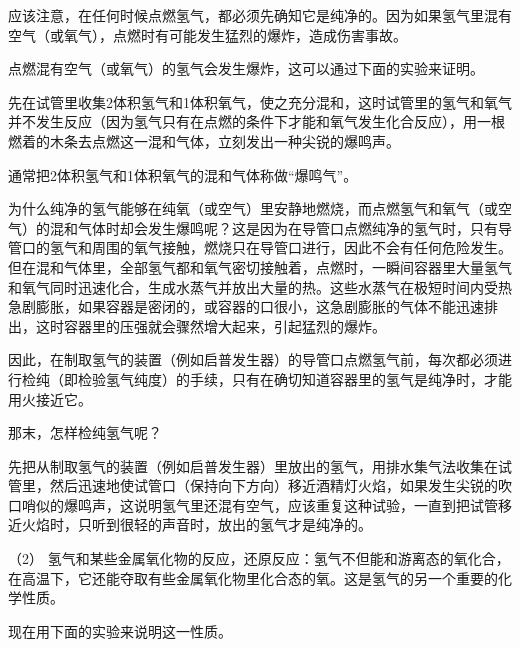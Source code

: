 应该注意，在任何时候点燃氢气，都必须先确知它是纯净的。因为如果氢气里混有空气（或氧气），点燃时有可能发生猛烈的爆炸，造成伤害事故。

点燃混有空气（或氧气）的氢气会发生爆炸，这可以通过下面的实验来证明。

先在试管里收集2体积氢气和1体积氧气，使之充分混和，这时试管里的氢气和氧气并不发生反应（因为氢气只有在点燃的条件下才能和氧气发生化合反应），用一根燃着的木条去点燃这一混和气体，立刻发出一种尖锐的爆鸣声。

通常把2体积氢气和1体积氧气的混和气体称做``爆鸣气''。

为什么纯净的氢气能够在纯氧（或空气）里安静地燃烧，而点燃氢气和氧气（或空气）的混和气体时却会发生爆鸣呢？这是因为在导管口点燃纯净的氢气时，只有导管口的氢气和周围的氧气接触，燃烧只在导管口进行，因此不会有任何危险发生。但在混和气体里，全部氢气都和氧气密切接触着，点燃时，一瞬间容器里大量氢气和氧气同时迅速化合，生成水蒸气并放出大量的热。这些水蒸气在极短时间内受热急剧膨胀，如果容器是密闭的，或容器的口很小，这急剧膨胀的气体不能迅速排出，这时容器里的压强就会骤然增大起来，引起猛烈的爆炸。

因此，在制取氢气的装置（例如启普发生器）的导管口点燃氢气前，每次都必须进行检纯（即检验氢气纯度）的手续，只有在确切知道容器里的氢气是纯净时，才能用火接近它。

那末，怎样检纯氢气呢？

先把从制取氢气的装置（例如启普发生器）里放出的氢气，用排水集气法收集在试管里，然后迅速地使试管口（保持向下方向）移近酒精灯火焰，如果发生尖锐的吹口哨似的爆鸣声，这说明氢气里还混有空气，应该重复这种试验，一直到把试管移近火焰时，只听到很轻的声音时，放出的氢气才是纯净的。

（2）
氢气和某些金属氧化物的反应，还原反应：氢气不但能和游离态的氧化合，在高温下，它还能夺取有些金属氧化物里化合态的氧。这是氢气的另一个重要的化学性质。

现在用下面的实验来说明这一性质。

